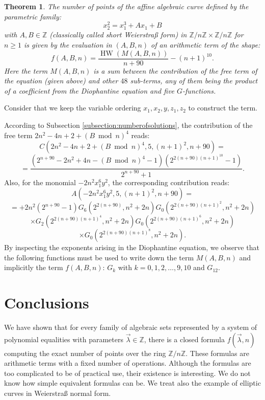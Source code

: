 \documentclass[10pt,a4paper]{article}
\theoremstyle{plain}
\newtheorem{theorem}{Theorem}[section]
\newcommand{\HW}{\operatorname{HW}}
\begin{document}
\begin{theorem}
    The number of points of the affine algebraic curve defined by the parametric family:
    $$ x_2^2 = x_1^3 + Ax_1 + B$$
    with $A, B \in \mathbb Z$  (classically called short Weierstra{\ss } form) in $\mathbb Z / n \mathbb Z \times \mathbb Z / n \mathbb Z$ for $n \geq 1$ is given by the evaluation in $(A, B, n)$ of an arithmetic term of the shape:
    $$f(A, B, n) = \frac{\HW(M(A, B, n))}{n + 90} - (n+1)^{10}.$$ 
    Here the term $M(A, B, n)$ is a sum between the contribution of the free term of the equation (given above) and other $48$ sub-terms, any of them being the product of a coefficient from the Diophantine equation and five $G$-functions. 
\end{theorem} 

Consider that we keep the variable ordering $x_1, x_2, y, z_1, z_2$ to construct the term.

According to Subsection \ref{subsection:numberofsolutions}, the contribution of the free term $2 n^2 - 4 n  + 2 + (B \bmod n)^4 $ reads:
$$ C\left (2 n^2 - 4 n  + 2 + (B \bmod n)^4, 5, (n+1)^2, n+90 \right ) = $$ $$ = \frac{ \left ( 2^{n + 90} - 2n^2 + 4n - (B \bmod n)^4 -1 \right ) \left ( 2^{2(n+90)  {(n+1)}^{10} } - 1\right )} {2^{n+90 } + 1 }.$$ 
Also, for the monomial $-2 n^2 x_1^6 y^2$, the corresponding contribution reads: 
$$ A\left (-2 n^2 x_1^6 y^2, 5, (n+1)^2, n+90 \right ) = $$ $$= + 2 n^2 \left( 2^{n+90} - 1 \right)  G_{6} \left( 2^{ 2 (n + 90) } , n^2 + 2n \right) G_{0} \left ( 2^{ 2 (n+90) {(n+1)}^2 } , n^2 + 2n \right ) $$
$$ \times G_{2} \left ( 2^{ 2 (n+90) (n+1)^4 } , n^2 + 2n \right ) G_{0} \left ( 2^{ 2 (n+90) (n+1)^6 } , n^2 + 2n\right ) $$ $$ \times G_{0} \left ( 2^{ 2 (n+90) (n+1)^8 } , n^2 + 2n \right ).$$
By inspecting the exponents arising in the Diophantine equation, we observe that the following functions must be used to write down the term $M(A, B, n)$ and implicitly the term $f(A, B, n)$: $G_k$ with $k = 0, 1, 2, \dots, 9, 10$ and $G_{12}$.


\section{Conclusions}
\label{sec:conclusions}

We have shown that for every family of algebraic sets represented by a system of polynomial equalities with parameters $\vec \lambda \in \mathbb Z$, there is a closed formula $f(\vec \lambda, n)$ computing the exact number of points over the ring $\mathbb Z / n \mathbb Z$. These formulas are arithmetic terms with a fixed number of operations. Although the formulas are too complicated to be of practical use, their existence is interesting. We do not know how simple equivalent formulas can be. We treat also the example of elliptic curves in Weierstra{\ss } normal form.
\end{document}
